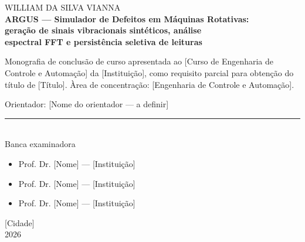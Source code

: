 \thispagestyle{empty}
\begin{center}

{\large WILLIAM DA SILVA VIANNA}\\[2.5cm]

{\Large\bfseries ARGUS --- Simulador de Defeitos em M\'aquinas Rotativas:}\\[0.3cm]
{\Large\bfseries gera\c{c}\~ao de sinais vibracionais sint\'eticos, an\'alise}\\[0.3cm]
{\Large\bfseries espectral FFT e persist\^encia seletiva de leituras}\\[3.2cm]

\end{center}

\OnehalfSpacing
\noindent\begin{minipage}{0.48\textwidth}
Monografia de conclus\~ao de curso apresentada ao
[Curso de Engenharia de Controle e Automa\c{c}\~ao] da
[Institui\c{c}\~ao], como requisito parcial para obten\c{c}\~ao do
t\'itulo de [T\'itulo]. \`Area de concentra\c{c}\~ao:
[Engenharia de Controle e Automa\c{c}\~ao].
\end{minipage}

\vspace{2.5cm}

\noindent Orientador: [Nome do orientador --- a definir]

\vspace{1.5cm}
\begin{center}
\begin{minipage}{0.6\textwidth}
\begin{center}
\rule{\textwidth}{0.4pt}\\[0.2cm]
Banca examinadora
\end{center}
\begin{itemize}
  \item Prof. Dr. [Nome] --- [Institui\c{c}\~ao]
  \item Prof. Dr. [Nome] --- [Institui\c{c}\~ao]
  \item Prof. Dr. [Nome] --- [Institui\c{c}\~ao]
\end{itemize}
\end{minipage}
\end{center}

\vfill
\begin{center}
{\large [Cidade]}\\[0.4cm]
{\large 2026}
\end{center}
\clearpage

